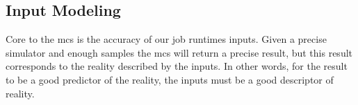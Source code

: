 \documentclass[10pt,conference,compsocconf]{IEEEtran}
\newcommand{\etal}[1]{\emph{#1 et al.}}
\begin{document}

\subsection{Input Modeling}

Core  to the  \acl{mcs} is  the accuracy  of our  job runtimes  inputs. Given  a
precise simulator and enough samples the  \ac{mcs} will return a precise result,
but this  result corresponds to  the reality described  by the inputs.  In other
words, for the result to be a good  predictor of the reality, the inputs must be
a good descriptor of reality.
\end{document}
